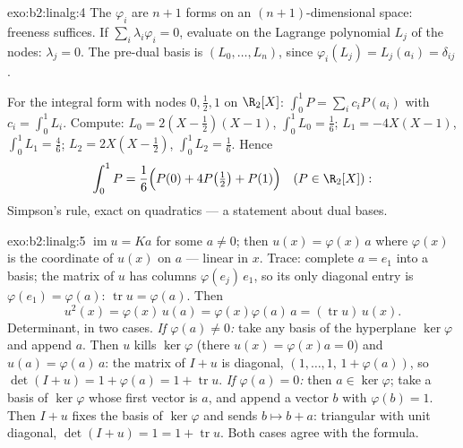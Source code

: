 \begin{solution}{exo:b2:linalg:4}
The $\varphi_i$ are $n + 1$ forms on an $(n+1)$-dimensional space:
freeness suffices. If $\sum_i \lambda_i \varphi_i = 0$, evaluate on
the Lagrange polynomial $L_j$ of the nodes: $\lambda_j = 0$. The
pre-dual basis is $(L_0, \dots, L_n)$, since $\varphi_i(L_j) =
L_j(a_i) = \delta_{ij}$.

For the integral form with nodes $0, \frac12, 1$ on $\R_2[X]$:
$\int_0^1 P = \sum_i c_i P(a_i)$ with $c_i = \int_0^1 L_i$. Compute:
$L_0 = 2(X - \tfrac12)(X - 1)$, $\int_0^1 L_0 = \frac16$; $L_1 =
-4X(X-1)$, $\int_0^1 L_1 = \frac46$; $L_2 = 2X(X - \tfrac12)$,
$\int_0^1 L_2 = \frac16$. Hence
\[
\int_0^1 P = \frac{1}{6}\Bigl(P(0) + 4P\bigl(\tfrac12\bigr) +
P(1)\Bigr)
\quad (P \in \R_2[X]) :
\]
Simpson's rule, exact on quadratics --- a statement about dual
bases.
\end{solution}

\begin{solution}{exo:b2:linalg:5}
$\operatorname{im} u = Ka$ for some $a \neq 0$; then $u(x) =
\varphi(x)\,a$ where $\varphi(x)$ is the coordinate of $u(x)$ on $a$
--- linear in $x$. Trace: complete $a = e_1$ into a basis; the
matrix of $u$ has columns $\varphi(e_j)\,e_1$, so its only diagonal
entry is $\varphi(e_1) = \varphi(a)$: $\operatorname{tr} u =
\varphi(a)$. Then
\[
u^2(x) = \varphi(x)\, u(a) = \varphi(x)\varphi(a)\, a
= (\operatorname{tr} u)\, u(x).
\]
Determinant, in two cases. \emph{If $\varphi(a) \neq 0$:} take any
basis of the hyperplane $\ker\varphi$ and append $a$. Then $u$ kills
$\ker\varphi$ (there $u(x) = \varphi(x)a = 0$) and $u(a) =
\varphi(a)\,a$: the matrix of $I + u$ is diagonal, $(1, \dots, 1,\,
1 + \varphi(a))$, so $\det(I + u) = 1 + \varphi(a) = 1 +
\operatorname{tr} u$. \emph{If $\varphi(a) = 0$:} then $a \in
\ker\varphi$; take a basis of $\ker\varphi$ whose first vector is
$a$, and append a vector $b$ with $\varphi(b) = 1$. Then $I + u$
fixes the basis of $\ker\varphi$ and sends $b \mapsto b + a$:
triangular with unit diagonal, $\det(I + u) = 1 = 1 +
\operatorname{tr} u$. Both cases agree with the formula.
\end{solution}

